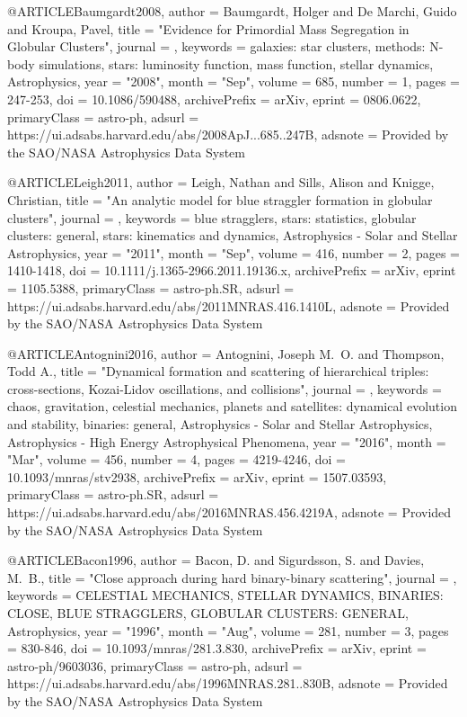 \documentclass[twocolumn,tighten]{aastex63}
\begin{document}
@ARTICLE{Baumgardt2008,
       author = {{Baumgardt}, Holger and {De Marchi}, Guido and {Kroupa}, Pavel},
        title = "{Evidence for Primordial Mass Segregation in Globular Clusters}",
      journal = {\apj},
     keywords = {galaxies: star clusters, methods: N-body simulations, stars: luminosity function, mass function, stellar dynamics, Astrophysics},
         year = "2008",
        month = "Sep",
       volume = {685},
       number = {1},
        pages = {247-253},
          doi = {10.1086/590488},
archivePrefix = {arXiv},
       eprint = {0806.0622},
 primaryClass = {astro-ph},
       adsurl = {https://ui.adsabs.harvard.edu/abs/2008ApJ...685..247B},
      adsnote = {Provided by the SAO/NASA Astrophysics Data System}
}

@ARTICLE{Leigh2011,
       author = {{Leigh}, Nathan and {Sills}, Alison and {Knigge}, Christian},
        title = "{An analytic model for blue straggler formation in globular clusters}",
      journal = {\mnras},
     keywords = {blue stragglers, stars: statistics, globular clusters: general, stars: kinematics and dynamics, Astrophysics - Solar and Stellar Astrophysics},
         year = "2011",
        month = "Sep",
       volume = {416},
       number = {2},
        pages = {1410-1418},
          doi = {10.1111/j.1365-2966.2011.19136.x},
archivePrefix = {arXiv},
       eprint = {1105.5388},
 primaryClass = {astro-ph.SR},
       adsurl = {https://ui.adsabs.harvard.edu/abs/2011MNRAS.416.1410L},
      adsnote = {Provided by the SAO/NASA Astrophysics Data System}
}

@ARTICLE{Antognini2016,
       author = {{Antognini}, Joseph M.~O. and {Thompson}, Todd A.},
        title = "{Dynamical formation and scattering of hierarchical triples: cross-sections, Kozai-Lidov oscillations, and collisions}",
      journal = {\mnras},
     keywords = {chaos, gravitation, celestial mechanics, planets and satellites: dynamical evolution and stability, binaries: general, Astrophysics - Solar and Stellar Astrophysics, Astrophysics - High Energy Astrophysical Phenomena},
         year = "2016",
        month = "Mar",
       volume = {456},
       number = {4},
        pages = {4219-4246},
          doi = {10.1093/mnras/stv2938},
archivePrefix = {arXiv},
       eprint = {1507.03593},
 primaryClass = {astro-ph.SR},
       adsurl = {https://ui.adsabs.harvard.edu/abs/2016MNRAS.456.4219A},
      adsnote = {Provided by the SAO/NASA Astrophysics Data System}
}

@ARTICLE{Bacon1996,
       author = {{Bacon}, D. and {Sigurdsson}, S. and {Davies}, M.~B.},
        title = "{Close approach during hard binary-binary scattering}",
      journal = {\mnras},
     keywords = {CELESTIAL MECHANICS, STELLAR DYNAMICS, BINARIES: CLOSE, BLUE STRAGGLERS, GLOBULAR CLUSTERS: GENERAL, Astrophysics},
         year = "1996",
        month = "Aug",
       volume = {281},
       number = {3},
        pages = {830-846},
          doi = {10.1093/mnras/281.3.830},
archivePrefix = {arXiv},
       eprint = {astro-ph/9603036},
 primaryClass = {astro-ph},
       adsurl = {https://ui.adsabs.harvard.edu/abs/1996MNRAS.281..830B},
      adsnote = {Provided by the SAO/NASA Astrophysics Data System}
}
\end{document}
